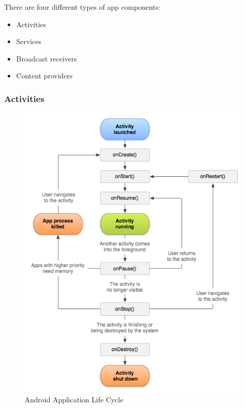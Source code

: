 \documentclass[14pt]{report}
\begin{document}
				There are four different types of app components:
				\begin{itemize}
					\item Activities
					\item Services
					\item Broadcast receivers
					\item Content providers
				\end{itemize}		

				\subsubsection{Activities}

					\begin{figure}[h]
						\includegraphics[width=12cm]{App Life Cycle.png}
						\centering
						\caption{Android Application Life Cycle}
					\end{figure}
\end{document}
